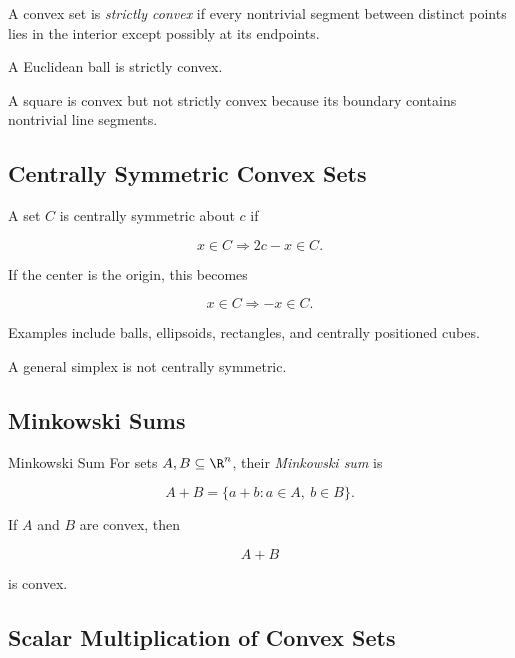 A convex set is \emph{strictly convex} if every nontrivial segment between
distinct points lies in the interior except possibly at its endpoints.

A Euclidean ball is strictly convex.

A square is convex but not strictly convex because its boundary contains
nontrivial line segments.

\subsection{Centrally Symmetric Convex Sets}
\label{subsec:centrally-symmetric-convex}

A set \(C\) is centrally symmetric about \(c\) if

\[
\boxed{
x\in C
\Longrightarrow
2c-x\in C.
}
\]

If the center is the origin, this becomes

\[
\boxed{
x\in C
\Longrightarrow
-x\in C.
}
\]

Examples include balls, ellipsoids, rectangles, and centrally positioned
cubes.

A general simplex is not centrally symmetric.

\subsection{Minkowski Sums}
\label{subsec:minkowski-sums}

\begin{definitionbox}{Minkowski Sum}
For sets \(A,B\subseteq\R^n\), their \emph{Minkowski sum} is

\[
\boxed{
A+B
=
\{a+b:a\in A,\ b\in B\}.
}
\]
\end{definitionbox}

If \(A\) and \(B\) are convex, then

\[
\boxed{
A+B
}
\]

is convex.

\subsection{Scalar Multiplication of Convex Sets}
\label{subsec:scalar-convex-sets}

